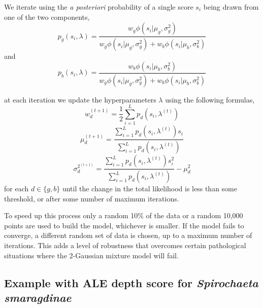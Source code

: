 \documentclass[phd,tocprelim]{cornell}
\begin{document}
We iterate using the {\it a posteriori} probability of a single score $s_{i}$ being drawn from one of the two components,
\begin{equation}
    p_{g}(s_{i}, \lambda) = \frac{w_{g} \phi\left(s_{i} | \mu_{g}, \sigma^{2}_{g}\right)}{w_{g} \phi\left(s_{i} | \mu_{g}, \sigma^{2}_{g}\right) + w_{b} \phi\left(s_{i} | \mu_{b}, \sigma^{2}_{b}\right)}
\end{equation}
and
\begin{equation}
    p_{b}(s_{i}, \lambda) = \frac{w_{b} \phi\left(s_{i} | \mu_{b}, \sigma^{2}_{b}\right)}{w_{g} \phi\left(s_{i} | \mu_{g}, \sigma^{2}_{g}\right) + w_{b} \phi\left(s_{i} | \mu_{b}, \sigma^{2}_{b}\right)}
\end{equation}

at each iteration we update the hyperparameters $\lambda$ using the following formulas,
\begin{equation}
    w_{d}^{(t+1)} = \frac{1}{2}\sum_{i=1}^{L} p_{d}(s_{i}, \lambda^{(t)})
\end{equation}
\begin{equation}
    \mu_{d}^{(t+1)} = \frac{\sum_{i=1}^{L} p_{d}(s_{i}, \lambda^{(t)}) s_{i}}{\sum_{i=1}^{L} p_{d}(s_{i}, \lambda^{(t)})}
\end{equation}
\begin{equation}
    \sigma_{d}^{2^{(t+1)}} = \frac{\sum_{i=1}^{L} p_{d}(s_{i}, \lambda^{(t)}) s_{i}^{2}}{\sum_{i=1}^{L} p_{d}(s_{i}, \lambda^{(t)})} - \mu_{d}^{2}
\end{equation}
for each $d \in \{g, b\}$ until the change in the total likelihood is less than some threshold, or after some number of maximum iterations.

To speed up this process only a random 10\% of the data or a random 10,000 points are used to build the model, whichever is smaller. If the model fails to converge, a different random set of data is chosen, up to a maximum number of iterations. This adds a level of robustness that overcomes certain pathological situations where the 2-Gaussian mixture model will fail.

\subsection{Example with ALE depth score for \it{Spirochaeta smaragdinae}}
\end{document}
